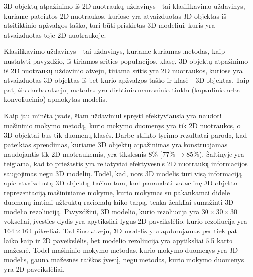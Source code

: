 
3D objektų atpažinimo iš 2D nuotraukų uždavinys - tai klasifikavimo uždavinys, kuriame pateiktos 2D nuotraukos, kuriose yra atvaizduotas 3D objektas iš atsitiktinio apžvalgos taško, turi būti priskirtas 3D modeliui, kuris yra atvaizduotas toje 2D nuotraukoje.

Klasifikavimo uždavinys - tai uždavinys, kuriame kuriamas metodas, kaip nustatyti pavyzdžio, iš tiriamos srities populiacijos, klasę. 3D objektų atpažinimo iš 2D nuotraukų uždavinio atveju, tiriama sritis yra 2D nuotraukos, kuriose yra atvaizduotas 3D objektas iš bet kurio apžvalgos taško ir klasė - 3D objektas. Taip pat, šio darbo atveju, metodas yra dirbtinio neuroninio tinklo (kapsulinio arba konvoliucinio) apmokytas modelis.

Kaip jau minėta įvade, šiam uždaviniui spręsti efektyviausia yra naudoti mašininio mokymo metodą, kurio mokymo duomenys yra tik 2D nuotraukos, o 3D objektai bus tik duomenų klasės. Darbe \cite{dbnExp} atlikto tyrimo rezultatai parodo, kad pateiktas sprendimas, kuriame 3D objektų atpažinimas yra konstruojamas naudojantis tik 2D nuotraukomis, yra tikslesnis 8\% (77\% → 85\%). Šaltinyje \cite{cnnExp1} yra teigiama, kad to priežastis yra reliatyviai efektyvesnis 2D nuotraukų informacijos saugojimas negu 3D modelių. Todėl, kad, nors 3D modelis turi visą informaciją apie atvaizduotą 3D objektą, tačiau tam, kad panaudoti vokselinę 3D objekto reprezentaciją mašininiame mokyme, kurio mokymas su pakankamai didele duomenų imtimi užtruktų racionalų laiko tarpą, tenka ženkliai sumažinti 3D modelio rezoliuciją. Pavyzdžiui, 3D modelio, kurio rezoliucija yra $30\times30\times30$ vokseliai, įvesties dydis yra apytiksliai lygus 2D paveikslėlio, kurio rezoliucija yra $164\times164$ pikseliai. Tad šiuo atveju, 3D modelis yra apdorojamas per tiek pat laiko kaip ir 2D paveikslėlis, bet modelio rezoliucija yra apytiksliai 5.5 karto mažesnė. Todėl mašininio mokymo metodas, kurio mokymo duomenys yra 3D modelis, gauna mažesnės raiškos įvestį, negu metodas, kurio mokymo duomenys yra 2D paveikslėliai.

